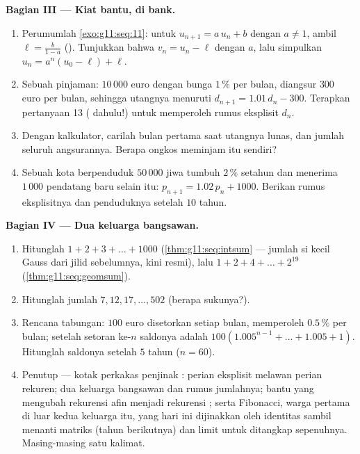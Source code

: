\begin{problem}
\medskip
\noindent\textbf{Bagian III --- Kiat  bantu, di
bank.}
\begin{enumerate}[resume]
  \item Perumumlah \cref{exo:g11:seq:11}: untuk
        $u_{n+1} = a\,u_n + b$ dengan $a \neq 1$, ambil
        $\ell = \frac{b}{1 - a}$ (). Tunjukkan bahwa
        $v_n = u_n - \ell$  dengan  $a$, lalu
        simpulkan
        $u_n = a^n (u_0 - \ell) + \ell$.
  \item Sebuah pinjaman: $10\,000$ euro dengan bunga $1\,\%$ per bulan,
        diangsur $300$ euro per bulan, sehingga utangnya menuruti
        $d_{n+1} = 1.01\,d_n - 300$. Terapkan pertanyaan 13 ( dahulu!) untuk memperoleh rumus eksplisit $d_n$.
  \item Dengan kalkulator, carilah bulan pertama saat
        utangnya lunas, dan jumlah seluruh angsurannya. Berapa
        ongkos meminjam itu sendiri?
  \item Sebuah kota berpenduduk $50\,000$ jiwa tumbuh $2\,\%$ setahun
        dan menerima $1\,000$ pendatang baru selain itu:
        $p_{n+1} = 1.02\,p_n + 1000$. Berikan rumus eksplisitnya
        dan penduduknya setelah $10$ tahun.
\end{enumerate}

\medskip
\noindent\textbf{Bagian IV --- Dua keluarga bangsawan.}
\begin{enumerate}[resume]
  \item Hitunglah $1 + 2 + 3 + \dots + 1000$
        (\cref{thm:g11:seq:intsum} --- jumlah si kecil Gauss dari
        jilid sebelumnya, kini resmi), lalu
        $1 + 2 + 4 + \dots + 2^{19}$
        (\cref{thm:g11:seq:geomsum}).
  \item Hitunglah jumlah 
        $7, 12, 17, \dots, 502$ (berapa sukunya?).
  \item Rencana tabungan: $100$ euro disetorkan setiap bulan, memperoleh
        $0.5\,\%$ per bulan; setelah setoran ke-$n$ saldonya
        adalah $100\left(1.005^{n-1} + \dots + 1.005 + 1\right)$.
        Hitunglah saldonya setelah $5$ tahun ($n = 60$).
  \item Penutup --- kotak perkakas penjinak : perian eksplisit
        melawan perian rekuren; dua keluarga bangsawan dan
        rumus jumlahnya;  bantu yang mengubah
        rekurensi afin menjadi rekurensi ; serta Fibonacci,
        warga pertama di luar kedua keluarga itu, yang hari ini dijinakkan
        oleh identitas sambil menanti matriks (tahun berikutnya) dan limit
        untuk ditangkap sepenuhnya. Masing-masing satu kalimat.

\end{enumerate}
\end{problem}
